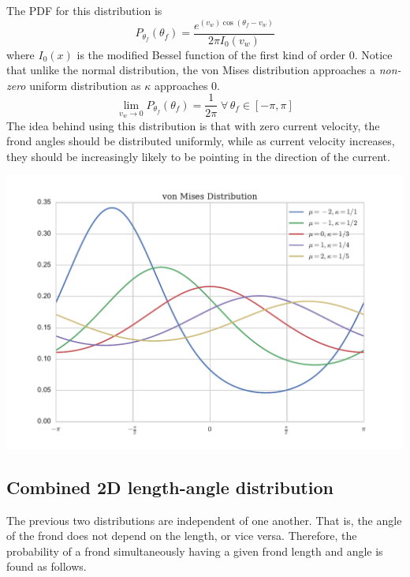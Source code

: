 \documentclass[10pt]{article}
\newenvironment{mcfig}
	{\par\medskip\noindent\minipage{\linewidth}}
	{\endminipage\par\medskip}
\begin{document}
\begin{multicols}{2}
The PDF for this distribution is
\begin{equation}
	P_{\theta_f}(\theta_f) = \frac{e^{(v_w)\cos(\theta_f-v_w)}}{2\pi I_0(v_w)}
\end{equation}
where $I_0(x)$ is the modified Bessel function of the first kind of order 0.
Notice that unlike the normal distribution, the von Mises distribution approaches a \textit{non-zero} uniform distribution as $\kappa$ approaches 0.
\begin{equation}
	\displaystyle \lim_{v_w \to 0}P_{\theta_f}(\theta_f) = \frac{1}{2\pi} \;\forall\, \theta_f \in [-\pi,\pi]
\end{equation}
The idea behind using this distribution is that with zero current velocity, the frond angles should be distributed uniformly, while as current velocity increases, they should be increasingly likely to be pointing in the direction of the current.

\begin{mcfig}
	\centering
	\includegraphics[width=\linewidth]{vonmises_2}
	\label{fig:vonmises}
\end{mcfig}

\subsection{Combined 2D length-angle distribution}
\label{sec:2d_dist}
The previous two distributions are independent of one another. That is, the angle of the frond does not depend on the length, or vice versa.
Therefore, the probability of a frond simultaneously having a given frond length and angle is found as follows.


\end{multicols}
\end{document}
